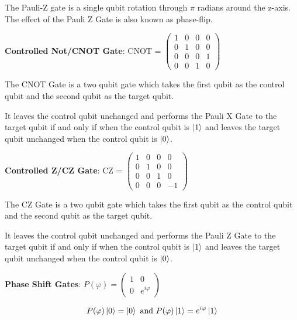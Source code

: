 \documentclass{article}
\begin{document}
\noindent
The Pauli-Z gate is a single qubit rotation through $\pi$ radians around the z-axis. The effect of the Pauli Z Gate is also known as phase-flip.
\vspace{5mm}

\textbf{Controlled Not/CNOT Gate}: \qquad CNOT = $\begin{pmatrix} 1 & 0 & 0 & 0 \\ 0 & 1 & 0 & 0 \\ 0 & 0 & 0 & 1 \\ 0 & 0 & 1 & 0 \end{pmatrix}$
\vspace{5mm}

\noindent
The CNOT Gate is a two qubit gate which takes the first qubit as the control qubit and the second qubit as the target qubit.
\vspace{5mm}

\noindent
It leaves the control qubit unchanged and performs the Pauli X Gate to the target qubit if and only if when the control qubit is $\ket{1}$ and leaves the target qubit unchanged when the control qubit is $\ket{0}$.
\vspace{5mm}

\textbf{Controlled Z/CZ Gate}: \qquad CZ = $\begin{pmatrix} 1 & 0 & 0 & 0 \\ 0 & 1 & 0 & 0 \\ 0 & 0 & 1 & 0 \\ 0 & 0 & 0 & -1 \end{pmatrix}$
\vspace{5mm}

\noindent
The CZ Gate is a two qubit gate which takes the first qubit as the control qubit and the second qubit as the target qubit.
\vspace{5mm}

\noindent
It leaves the control qubit unchanged and performs the Pauli Z Gate to the target qubit if and only if when the control qubit is $\ket{1}$ and leaves the target qubit unchanged when the control qubit is $\ket{0}$.
\pagebreak

\textbf{Phase Shift Gates}: \qquad $ P(\varphi) = \begin{pmatrix} 1 & 0 \\ 0 & e^{i\varphi} \end{pmatrix}$ 
\vspace{5mm}

\begin{equation}
P(\varphi)\ket{0} = \ket{0} \ \text{and} \ P(\varphi)\ket{1} = e^{i\varphi}\ket{1} 
\end{equation}
\end{document}

